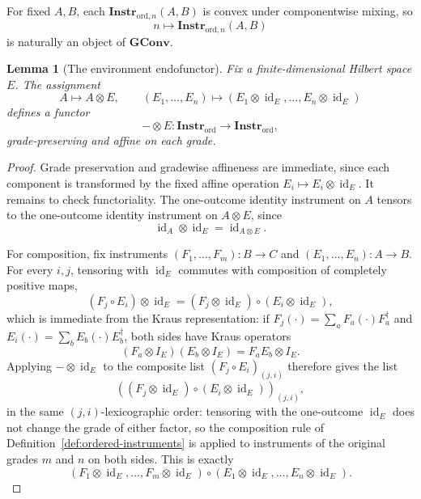 \documentclass[11pt]{article}
\newtheorem{lemma}[theorem]{Lemma}
\DeclareMathOperator{\id}{id}
\begin{document}
For fixed $A,B$, each $\mathbf{Instr}_{\mathrm{ord},n}(A,B)$ is convex
under componentwise mixing, so
\[
n\longmapsto \mathbf{Instr}_{\mathrm{ord},n}(A,B)
\]
is naturally an object of $\mathbf{GConv}$.

\begin{lemma}[The environment endofunctor]
\label{lem:env-functor}
Fix a finite-dimensional Hilbert space $E$. The assignment
\[
A\longmapsto A\otimes E,
\qquad
(E_1,\dots,E_n)\longmapsto
(E_1\otimes\id_E,\dots,E_n\otimes\id_E)
\]
defines a functor
\[
-\otimes E:\mathbf{Instr}_{\mathrm{ord}}\to
\mathbf{Instr}_{\mathrm{ord}},
\]
grade-preserving and affine on each grade.
\end{lemma}

\begin{proof}
Grade preservation and gradewise affineness are immediate, since each
component is transformed by the fixed affine operation
$E_i\mapsto E_i\otimes\id_E$. It remains to check functoriality. The
one-outcome identity instrument on $A$ tensors to the one-outcome identity
instrument on $A\otimes E$, since
\[
\id_A\otimes\id_E=\id_{A\otimes E}.
\]

For composition, fix instruments $(F_1,\dots,F_m):B\to C$ and
$(E_1,\dots,E_n):A\to B$. For every $i,j$, tensoring with $\id_E$ commutes
with composition of completely positive maps,
\[
(F_j\circ E_i)\otimes\id_E
=
(F_j\otimes\id_E)\circ(E_i\otimes\id_E),
\]
which is immediate from the Kraus representation: if
$F_j(\cdot)=\sum_a F_a(\cdot)F_a^\dagger$ and
$E_i(\cdot)=\sum_b E_b(\cdot)E_b^\dagger$, both sides have Kraus operators
\[
(F_a\otimes I_E)(E_b\otimes I_E)=F_aE_b\otimes I_E.
\]
Applying $-\otimes\id_E$ to the composite list
$(F_j\circ E_i)_{(j,i)}$ therefore gives the list
\[
((F_j\otimes\id_E)\circ(E_i\otimes\id_E))_{(j,i)},
\]
in the same $(j,i)$-lexicographic order: tensoring with the one-outcome
$\id_E$ does not change the grade of either factor, so the composition rule
of Definition~\ref{def:ordered-instruments} is applied to instruments of the
original grades $m$ and $n$ on both sides. This is exactly
\[
(F_1\otimes\id_E,\dots,F_m\otimes\id_E)
\circ
(E_1\otimes\id_E,\dots,E_n\otimes\id_E).
\]
\end{proof}
\end{document}
